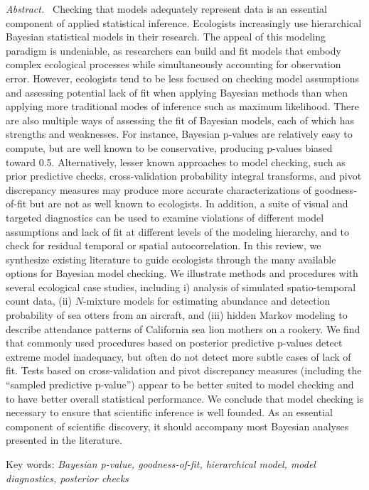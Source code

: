 \documentclass[12pt,english]{article}
\begin{document}
\begin{spacing}{1.9}
{\em Abstract.\ } Checking that models adequately represent data is an
essential component of applied statistical inference.  Ecologists
increasingly use hierarchical Bayesian statistical models in their
research.  The appeal of this modeling paradigm is undeniable, as
researchers can build and fit models that embody complex ecological
processes while simultaneously accounting for observation
error. However, ecologists tend to be less focused on checking model
assumptions and assessing potential lack of fit when applying Bayesian
methods than when applying more traditional modes of inference such as
maximum likelihood.  There are also multiple ways of assessing the fit
of Bayesian models, each of which has strengths and weaknesses.  For
instance, Bayesian p-values are relatively easy to compute, but are
well known to be conservative, producing p-values biased toward 0.5.
Alternatively, lesser known approaches to model checking, such as
prior predictive checks, cross-validation probability integral
transforms, and pivot discrepancy measures may produce more accurate
characterizations of goodness-of-fit but are not as well known to
ecologists.  In addition, a suite of visual and targeted diagnostics
can be used to examine violations of different model assumptions and
lack of fit at different levels of the modeling hierarchy, and to
check for residual temporal or spatial autocorrelation.  In this
review, we synthesize existing literature to guide ecologists through
the many available options for Bayesian model checking.  We illustrate
methods and procedures with several ecological case studies, including
i) analysis of simulated spatio-temporal count data, (ii) $N$-mixture
models for estimating abundance and detection probability of sea
otters from an aircraft, and (iii) hidden Markov modeling to describe
attendance patterns of California sea lion mothers on a rookery.  We
find that commonly used procedures based on posterior predictive
p-values detect extreme model inadequacy, but often do not detect more
subtle cases of lack of fit.  Tests based on cross-validation and
pivot discrepancy measures (including the ``sampled predictive
p-value'') appear to be better suited to model checking and to have
better overall statistical performance. We conclude that model
checking is necessary to ensure that scientific inference is well founded.
As an essential component of scientific discovery, it should
accompany most Bayesian analyses presented in the literature.


{Key words: \em Bayesian p-value, goodness-of-fit, hierarchical model,
  model diagnostics, posterior checks}




\end{spacing}
\end{document}
